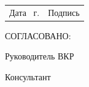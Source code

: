 
\intervalS%


\noindent
\begin{minipage}{\linewidth}
	\vspace{\mfloatsep} %
	\begin{tabularx}{\linewidth}{Xl}

		\hspace*{-0.7em} Дата \uline{\thesisStartDate}~г. &Подпись \underline{\hspace*{0.1\textheight}} \\
		\end{tabularx}
	\vspace{\mfloatsep} %
\end{minipage}

\intervalS%

\noindent\MakeUppercase{Согласовано:}

\intervalS%

\noindent Руководитель ВКР \uline{\hspace*{0.1\textheight} \Supervisor}

\intervalS%

\noindent Консультант \uline{\hspace*{0.1\textheight}\ConsultantExtra}

\vspace{4mm plus2fill}%


